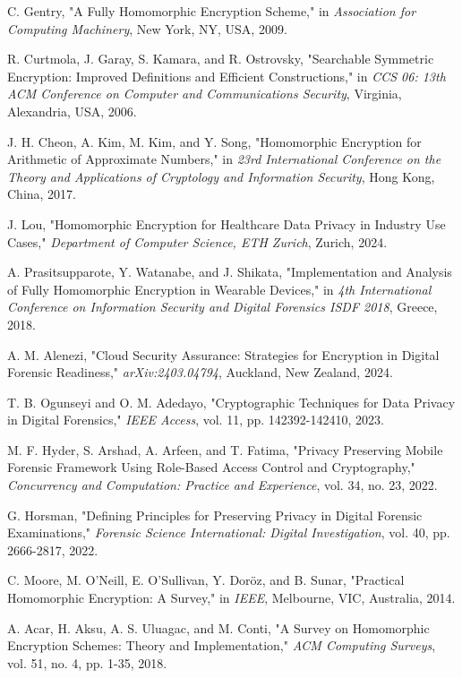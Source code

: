 \documentclass[conference]{IEEEtran}
\begin{document}
\begin{thebibliography}{00}
 C. Gentry, "A Fully Homomorphic Encryption Scheme," in \textit{Association for Computing Machinery}, New York, NY, USA, 2009.

 R. Curtmola, J. Garay, S. Kamara, and R. Ostrovsky, "Searchable Symmetric Encryption: Improved Definitions and Efficient Constructions," in \textit{CCS 06: 13th ACM Conference on Computer and Communications Security}, Virginia, Alexandria, USA, 2006.

 J. H. Cheon, A. Kim, M. Kim, and Y. Song, "Homomorphic Encryption for Arithmetic of Approximate Numbers," in \textit{23rd International Conference on the Theory and Applications of Cryptology and Information Security}, Hong Kong, China, 2017.

 J. Lou, "Homomorphic Encryption for Healthcare Data Privacy in Industry Use Cases," \textit{Department of Computer Science, ETH Zurich}, Zurich, 2024.

 A. Prasitsupparote, Y. Watanabe, and J. Shikata, "Implementation and Analysis of Fully Homomorphic Encryption in Wearable Devices," in \textit{4th International Conference on Information Security and Digital Forensics ISDF 2018}, Greece, 2018.

 A. M. Alenezi, "Cloud Security Assurance: Strategies for Encryption in Digital Forensic Readiness," \textit{arXiv:2403.04794}, Auckland, New Zealand, 2024.

 T. B. Ogunseyi and O. M. Adedayo, "Cryptographic Techniques for Data Privacy in Digital Forensics," \textit{IEEE Access}, vol. 11, pp. 142392-142410, 2023.

 M. F. Hyder, S. Arshad, A. Arfeen, and T. Fatima, "Privacy Preserving Mobile Forensic Framework Using Role-Based Access Control and Cryptography," \textit{Concurrency and Computation: Practice and Experience}, vol. 34, no. 23, 2022.

 G. Horsman, "Defining Principles for Preserving Privacy in Digital Forensic Examinations," \textit{Forensic Science International: Digital Investigation}, vol. 40, pp. 2666-2817, 2022.

 C. Moore, M. O’Neill, E. O'Sullivan, Y. Doröz, and B. Sunar, "Practical Homomorphic Encryption: A Survey," in \textit{IEEE}, Melbourne, VIC, Australia, 2014.

 A. Acar, H. Aksu, A. S. Uluagac, and M. Conti, "A Survey on Homomorphic Encryption Schemes: Theory and Implementation," \textit{ACM Computing Surveys}, vol. 51, no. 4, pp. 1-35, 2018.


\end{thebibliography}
\end{document}
